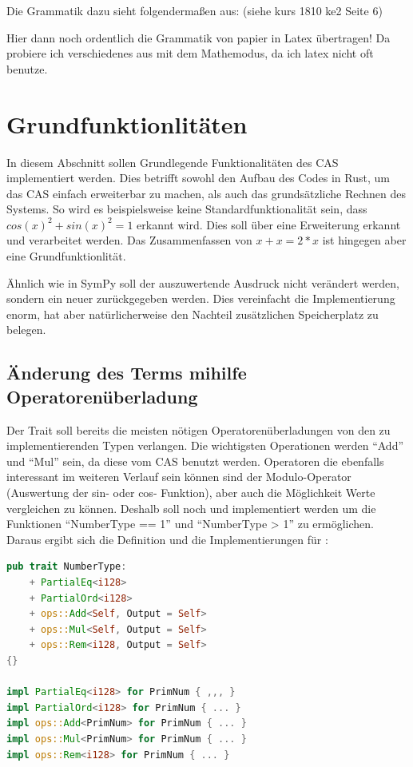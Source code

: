 \documentclass[11pt,a4paper, ngerman]{article}
\begin{document}
Die Grammatik dazu sieht folgendermaßen aus: (siehe kurs 1810 ke2 Seite 6)

Hier dann noch ordentlich die Grammatik von papier in Latex übertragen! Da probiere ich verschiedenes aus mit dem Mathemodus, da ich latex nicht oft benutze.

\newpage

\section{Grundfunktionlitäten}
In diesem Abschnitt sollen Grundlegende Funktionalitäten des CAS implementiert werden. Dies betrifft sowohl den Aufbau des Codes in Rust, um das CAS einfach erweiterbar zu machen, als auch das grundsätzliche Rechnen des Systems. So wird es beispielsweise keine Standardfunktionalität sein, dass $cos(x)^2+sin(x)^2 = 1$ erkannt wird. Dies soll über eine Erweiterung erkannt und verarbeitet werden. Das Zusammenfassen von $x+x=2*x$ ist hingegen aber eine Grundfunktionlität.

Ähnlich wie in SymPy soll der auszuwertende Ausdruck nicht verändert werden, sondern ein neuer zurückgegeben werden. Dies vereinfacht die Implementierung enorm, hat aber natürlicherweise den Nachteil zusätzlichen Speicherplatz zu belegen.

\subsection{Änderung des Terms mihilfe Operatorenüberladung}
Der Trait  soll bereits die meisten nötigen Operatorenüberladungen von den zu implementierenden Typen verlangen. Die wichtigsten Operationen werden ``Add'' und ``Mul'' sein, da diese vom CAS benutzt werden. Operatoren die ebenfalls interessant im weiteren Verlauf sein können sind der Modulo-Operator (Auswertung der sin- oder cos- Funktion), aber auch die Möglichkeit Werte vergleichen zu können. Deshalb soll noch  und  implementiert werden um die Funktionen ``NumberType == 1'' und ``NumberType > 1'' zu ermöglichen. Daraus ergibt sich die Definition und die Implementierungen für :

\begin{lstlisting}[language=rust, caption={trait NumberType 1. Iteration}]
pub trait NumberType:
    + PartialEq<i128>
    + PartialOrd<i128>
    + ops::Add<Self, Output = Self>
    + ops::Mul<Self, Output = Self>
    + ops::Rem<i128, Output = Self>
{}

impl PartialEq<i128> for PrimNum { ,,, }
impl PartialOrd<i128> for PrimNum { ... }
impl ops::Add<PrimNum> for PrimNum { ... }
impl ops::Mul<PrimNum> for PrimNum { ... }
impl ops::Rem<i128> for PrimNum { ... }
\end{lstlisting}
\end{document}
